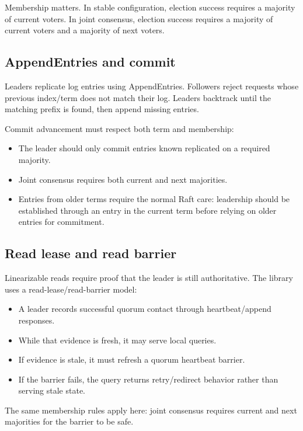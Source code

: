 Membership matters. In stable configuration, election success requires a
majority of current voters. In joint consensus, election success requires a
majority of current voters and a majority of next voters.

\subsection{AppendEntries and commit}

Leaders replicate log entries using AppendEntries. Followers reject requests
whose previous index/term does not match their log. Leaders backtrack until the
matching prefix is found, then append missing entries.

Commit advancement must respect both term and membership:

\begin{itemize}
\item The leader should only commit entries known replicated on a required majority.
\item Joint consensus requires both current and next majorities.
\item Entries from older terms require the normal Raft care: leadership should be
established through an entry in the current term before relying on older entries
for commitment.
\end{itemize}

\subsection{Read lease and read barrier}

Linearizable reads require proof that the leader is still authoritative. The
library uses a read-lease/read-barrier model:

\begin{itemize}
\item A leader records successful quorum contact through heartbeat/append responses.
\item While that evidence is fresh, it may serve local queries.
\item If evidence is stale, it must refresh a quorum heartbeat barrier.
\item If the barrier fails, the query returns retry/redirect behavior rather than
serving stale state.
\end{itemize}

The same membership rules apply here: joint consensus requires current and next
majorities for the barrier to be safe.


